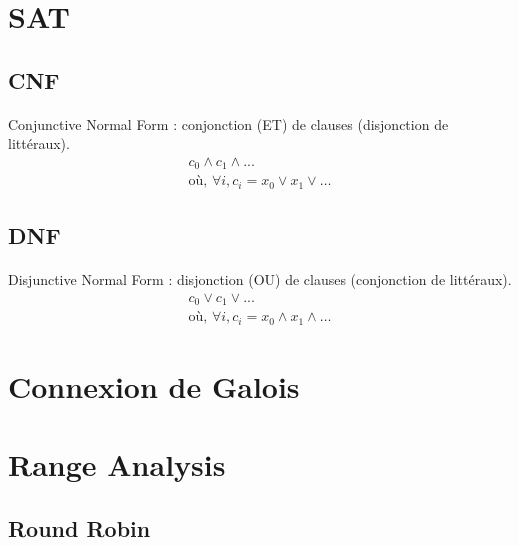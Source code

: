 \documentclass{article}
\begin{document}
  \section{SAT}
  \subsection{CNF}
  \paragraph{}
    Conjunctive Normal Form : conjonction (ET) de clauses (disjonction de littéraux).
    \begin{align*}
      c_0 \land c_1 \land ... \\
      \text{où, } \forall i, c_i = x_0 \lor x_1 \lor \ldots
    \end{align*}

  \subsection{DNF}
  \paragraph{}
    Disjunctive Normal Form : disjonction (OU) de clauses (conjonction de littéraux).
    \begin{align*}
      c_0 \lor c_1 \lor ... \\
      \text{où, } \forall i, c_i = x_0 \land x_1 \land \ldots
    \end{align*}


  \section{Connexion de Galois}
  \subsection{}

  \section{Range Analysis}
    \subsection{Round Robin}
    \begin{algorithm}
    \begin{algorithmic}
      \ENDFOR

					\ENDIF
				\ENDFOR
      \ENDWHILE
    \end{algorithmic}
    \end{algorithm}
\end{document}
